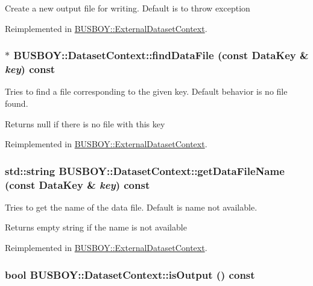 Create a new output file for writing. Default is to throw exception 

Reimplemented in \hyperlink{classBUSBOY_1_1ExternalDatasetContext_a26b99881ddf50b9956773a0ff390dd7b}{BUSBOY::ExternalDatasetContext}.\hypertarget{classBUSBOY_1_1DatasetContext_a37fe67fa469141703703e7eee9c50a14}{
\subsubsection[{findDataFile}]{ $\ast$ BUSBOY::DatasetContext::findDataFile (const {\bf DataKey} \& {\em key}) const}}
\label{classBUSBOY_1_1DatasetContext_a37fe67fa469141703703e7eee9c50a14}


Tries to find a file corresponding to the given key. Default behavior is no file found. \begin{DoxyReturn}{Returns}
null if there is no file with this key 
\end{DoxyReturn}


Reimplemented in \hyperlink{classBUSBOY_1_1ExternalDatasetContext_a59835bb9652ace84e3962feb993e4801}{BUSBOY::ExternalDatasetContext}.\hypertarget{classBUSBOY_1_1DatasetContext_ae85935dfaf6cb24e10e69f3d466c6699}{
\subsubsection[{getDataFileName}]{\setlength{\rightskip}{0pt plus 5cm}std::string BUSBOY::DatasetContext::getDataFileName (const {\bf DataKey} \& {\em key}) const}}
\label{classBUSBOY_1_1DatasetContext_ae85935dfaf6cb24e10e69f3d466c6699}


Tries to get the name of the data file. Default is name not available. \begin{DoxyReturn}{Returns}
empty string if the name is not available 
\end{DoxyReturn}


Reimplemented in \hyperlink{classBUSBOY_1_1ExternalDatasetContext_a263a61c46130cbed03bd843637955f1a}{BUSBOY::ExternalDatasetContext}.\hypertarget{classBUSBOY_1_1DatasetContext_a25d929ed419ebb4c006d4926f53f504e}{
\subsubsection[{isOutput}]{\setlength{\rightskip}{0pt plus 5cm}bool BUSBOY::DatasetContext::isOutput () const}}
\label{classBUSBOY_1_1DatasetContext_a25d929ed419ebb4c006d4926f53f504e}


